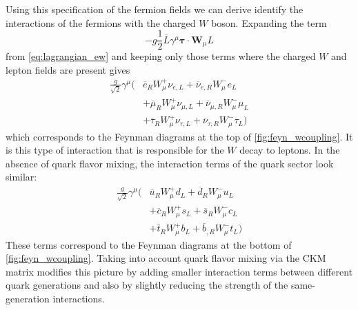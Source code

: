 Using this specification of the fermion fields 
we can derive identify the interactions of the fermions with the 
charged $W$ boson.  Expanding the term 
\begin{equation}
-g \frac{1}{2} \overline{L}\gamma^{\mu}\boldsymbol{\tau} \cdot \textbf{W}_{\mu} L 
\end{equation}
from \eqn\eqref{eq:lagrangian_ew}
and keeping only those
terms where the charged $W$ and lepton fields are present gives
\begin{equation}
\begin{aligned}
\frac{g}{\sqrt{2}}\gamma^{\mu}\Big( &
\overline{e}_R W_{\mu}^+ \nu_{e,L} +
\overline{\nu}_{e,R} W^-_{\mu} e_L \\&+
\overline{\mu}_R W_{\mu}^+ \nu_{\mu,L} +
\overline{\nu}_{\mu,R} W^-_{\mu} \mu_L \\&+
\overline{\tau}_R W_{\mu}^+ \nu_{\tau,L} +
\overline{\nu}_{\tau,R} W^-_{\mu} \tau_L \Big)
\end{aligned}
\end{equation}
which corresponds to the Feynman diagrams at the top
of \fig\ref{fig:feyn_wcoupling}. It is this
type of interaction that is responsible for the $W$ decay to leptons.
In the absence of quark flavor mixing, the interaction terms 
of the quark sector look similar:
\begin{equation}
\begin{aligned}
\frac{g}{\sqrt{2}}\gamma^{\mu}\Big( &
\overline{u}_R W_{\mu}^+ d_{L} +
\overline{d}_{R} W^-_{\mu} u_L \\&+
\overline{c}_R W_{\mu}^+ s_{L} +
\overline{s}_{R} W^-_{\mu} c_L \\&+
\overline{t}_R W_{\mu}^+ b_{L} +
\overline{b}_{,R} W^-_{\mu} t_L \Big)
\end{aligned}
\end{equation}
These terms correspond to the Feynman diagrams at the bottom
of \fig\ref{fig:feyn_wcoupling}.
Taking into account quark flavor mixing via the CKM matrix
modifies this picture by adding smaller interaction
terms between different quark generations and also by slightly reducing
the strength of the same-generation interactions.


